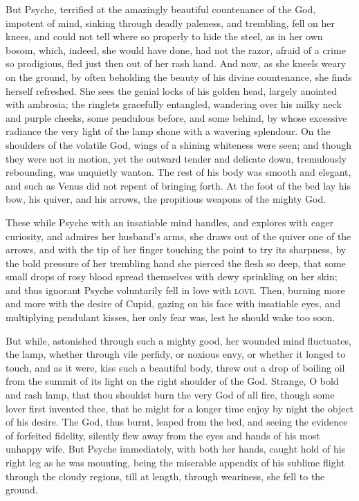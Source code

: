 \documentclass[12pt]{article}
\begin{document}
But Psyche, terrified at the amazingly beautiful countenance of the God,
impotent of mind, sinking through deadly paleness, and trembling, fell on her
knees, and could not tell where so properly to hide the steel, as in her own
bosom, which, indeed, she would have done, had not the razor, afraid of a crime
so prodigious, fled just then out of her rash hand. And now, as she kneels
weary on the ground, by often beholding the beauty of his divine countenance,
she finds herself refreshed. She sees the genial locks of his golden head,
largely anointed with ambrosia; the ringlets gracefully entangled, wandering
over his milky neck and purple cheeks, some pendulous before, and some behind,
by whose excessive radiance the very light of the lamp shone with a wavering
splendour. On the shoulders of the volatile God, wings of a shining whiteness
were seen; and though they were not in motion, yet the outward tender and
delicate down, tremulously rebounding, was unquietly wanton. The rest of his
body was smooth and elegant, and such as Venus did not repent of bringing
forth. At the foot of the bed lay his bow, his quiver, and his arrows, the
propitious weapons of the mighty God.

These while Psyche with an insatiable mind handles, and explores with eager
curiosity, and admires her husband's arms, she draws out of the quiver one of
the arrows, and with the tip of her finger touching the point to try its
sharpness, by the bold pressure of her trembling hand she pierced the flesh so
deep, that some small drops of rosy blood spread themselves with dewy
sprinkling on her skin; and thus ignorant Psyche voluntarily fell in love with
\textsc{love}. Then, burning more and more with the desire of Cupid, gazing on
his face with insatiable eyes, and multiplying pendulant kisses, her only fear
was, lest he should wake too soon.

But while, astonished through such a mighty good, her wounded mind fluctuates,
the lamp, whether through vile perfidy, or noxious envy, or whether it longed
to touch, and as it were, kiss such a beautiful body, threw out a drop of
boiling oil from the summit of its light on the right shoulder of the God.
Strange, O bold and rash lamp, that thou shouldst burn the very God of all
fire, though some lover first invented thee, that he might for a longer time
enjoy by night the object of his desire. The God, thus burnt, leaped from the
bed, and seeing the evidence of forfeited fidelity, silently flew away from
the eyes and hands of his most unhappy wife. But Psyche immediately, with both
her hands, caught hold of his right leg as he was mounting, being the miserable
appendix of his sublime flight through the cloudy regions, till at length,
through weariness, she fell to the ground.
\end{document}
